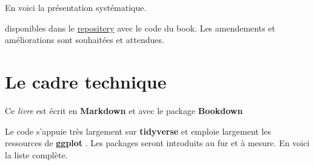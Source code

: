 \documentclass[
]{book}
\begin{document}
En voici la présentation systématique.

disponibles dans le \href{https://benaventc.github.io//}{repositery} avec le code du book. Les amendements et améliorations sont souhaitées et attendues.

\hypertarget{le-cadre-technique}{%
\section{Le cadre technique}\label{le-cadre-technique}}

Ce \emph{livre} est écrit en \textbf{Markdown} \citep{allaire_rmarkdown_2021} et avec le package \textbf{Bookdown} \citep{R-bookdown}

Le code s'appuie très largement sur \textbf{tidyverse} et emploie largement les ressources de \textbf{ggplot} . Les packages seront introduits au fur et à mesure. En voici la liste complète.
\end{document}

